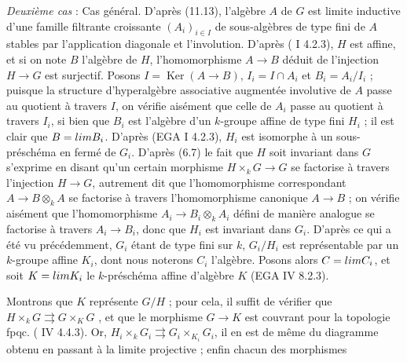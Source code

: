 \documentclass[11pt,a4paper]{article}
\begin{document}
\emph{Deuxième cas} : Cas général. D'après (11.13), l'algèbre $A$ de $G$
est limite inductive d'une famille filtrante croissante
$(A_{i})_{i \in I}$ de sous-algèbres de type fini de $A$ stables par
l'application diagonale et l'involution. D'après
( I 4.2.3), $H$ est affine, et si on note $B$
l'algèbre de $H$, l'homomorphisme $A \longrightarrow B$ déduit de
l'injection $H \longrightarrow G$ est surjectif. Posons
$I = \operatorname{Ker}(A \to B)$, $I_{i} = I \cap A_{i}$ et
$B_{i} = A_{i}/I_{i}$ ; puisque la structure d'hyperalgèbre associative
augmentée involutive de $A$ passe au quotient à travers $I$, on vérifie
aisément que celle de $A_{i}$ passe au quotient à travers $I_{i}$, si bien
que $B_{i}$ est l'algèbre d'un $k$-groupe affine de type fini $H_{i}$ ; il
est clair que $B = \varinjlim B_{i}$. D'après (EGA I 4.2.3), $H_{i}$ est
isomorphe à un sous-préschéma en  fermé de $G_{i}$.
D'après (6.7) le fait que $H$ soit invariant dans $G$ s'exprime en disant
qu'un certain morphisme $H \times_{k} G \longrightarrow G$ se factorise à
travers l'injection $H \to G$, autrement dit que l'homomorphisme
correspondant $A \longrightarrow B \otimes_{k} A$ se factorise à travers
l'homomorphisme canonique $A \longrightarrow B$ ; on vérifie aisément que
l'homomorphisme $A_{i} \longrightarrow B_{i} \otimes_{k} A_{i}$ défini de
manière analogue se factorise à travers $A_{i} \longrightarrow B_{i}$, donc
que $H_{i}$ est invariant dans $G_{i}$. D'après ce qui a été vu
précédemment, $G_{i}$ étant de type fini sur $k$, $G_{i}/H_{i}$ est
représentable par un $k$-groupe affine $K_{i}$, dont nous noterons $C_{i}$
l'algèbre. Posons alors $C = \varinjlim C_{i}$, et soit
$K = \varprojlim K_{i}$ le $k$-préschéma affine d'algèbre $K$ (EGA IV
8.2.3).

Montrons que $K$ représente $G/H$ ; pour cela, il suffit de vérifier que
 $H \times_{k} G \rightrightarrows G \times_{K} G$
, et que le morphisme $G \to K$ est couvrant pour la
topologie fpqc. ( IV 4.4.3). Or,  
$H_{i} \times_{k} G_{i} \rightrightarrows G_{i} \times_{K_{i}} G_{i}$,
  il en est de même du 
diagramme obtenu en passant à la limite projective ; enfin chacun des
morphismes
\end{document}
